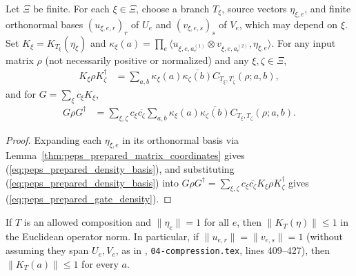 \begin{lemma}
    \label{thm:peps_prepared_gate_density}
    \leanok
    Let $\Xi$ be finite. For each $\xi\in\Xi$, choose a branch $T_\xi$, source
    vectors $\eta_{\xi,e}$, and finite orthonormal bases $(u_{\xi,e,r})_r$ of
    $U_e$ and $(v_{\xi,e,s})_s$ of $V_e$, which may depend on $\xi$. Set
    $K_\xi=K_{T_\xi}(\eta_\xi)$ and
    $\kappa_\xi(a)=\prod_e\langle u_{\xi,e,a_e^{(1)}}\otimes v_{\xi,e,a_e^{(2)}},\eta_{\xi,e}\rangle$.
    For any input matrix $\rho$ (not necessarily positive or normalized) and
    any $\xi,\zeta\in\Xi$,
    \begin{align}
        K_\xi\rho K_\zeta^\dagger
         & =\sum_{a,b}\kappa_\xi(a)\overline{\kappa_\zeta(b)}
        C_{T_\xi,T_\zeta}(\rho;a,b),
        \label{eq:peps_prepared_density_basis}
    \end{align}
    and for $G=\sum_\xi c_\xi K_\xi$,
    \begin{align}
        G\rho G^\dagger
         & =\sum_{\xi,\zeta}c_\xi\overline{c_\zeta}
        \sum_{a,b}\kappa_\xi(a)\overline{\kappa_\zeta(b)}
        C_{T_\xi,T_\zeta}(\rho;a,b).
        \label{eq:peps_prepared_gate_density}
    \end{align}
\end{lemma}

\begin{proof}\leanok
    Expanding each $\eta_{\xi,e}$ in its orthonormal basis via
    Lemma~\ref{thm:peps_prepared_matrix_coordinates} gives
    (\ref{eq:peps_prepared_density_basis}), and substituting
    (\ref{eq:peps_prepared_density_basis}) into
    $G\rho G^\dagger=\sum_{\xi,\zeta}c_\xi\overline{c_\zeta}K_\xi\rho K_\zeta^\dagger$
    gives (\ref{eq:peps_prepared_gate_density}).
\end{proof}

\begin{lemma}
    \label{thm:peps_prepared_matrix_contraction}
    \leanok
    If $T$ is an allowed composition and $\|\eta_e\|=1$ for all $e$, then
    $\|K_T(\eta)\|\le1$ in the Euclidean operator norm. In particular, if
    $\|u_{e,r}\|=\|v_{e,s}\|=1$ (without assuming they span $U_e,V_e$, as in
    \cite[proof of Theorem~5.2]{OpenAI2026PolynomialPEPS},
    \texttt{04-compression.tex}, lines 409--427), then $\|K_T(a)\|\le1$ for
    every $a$.
\end{lemma}

